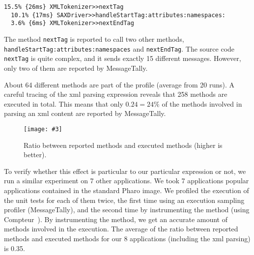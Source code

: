 \documentclass{sig-alternate}
\newcommand{\ct}{\lstinline[backgroundcolor=\color{white},basicstyle=\footnotesize\ttfamily]}
\newcommand{\fig}[4]{
	\begin{figure}[#1]
		\centering
		\texttt{[image: \#3]}
		\caption{\label{fig:#3}#4}
	\end{figure}}
\begin{document}
\begin{lstlisting}
15.5% {26ms} XMLTokenizer>>nextTag
  10.1% {17ms} SAXDriver>>handleStartTag:attributes:namespaces:
  3.6% {6ms} XMLTokenizer>>nextEndTag
\end{lstlisting}

The method \ct{nextTag} is reported to call two other methods, \ct{handleStartTag:attributes:namespaces} and \ct{nextEndTag}. The source code \ct{nextTag} is quite complex, and it sends exactly 15 different messages. However, only two of them are reported by MessageTally.

About 64 different methods are part of the profile (average from 20 runs). A careful tracing of the xml parsing expression reveals that 258 methods are executed in total. This means that only $0.24 = 24\%$ of the methods involved in parsing an xml content are reported by MessageTally. 

		

\fig{h}{0.5}{Ratio}{Ratio between reported methods and executed methods (higher is better).}

To verify whether this effect is particular to our particular expression or not, we run a similar experiment on 7 other applications.
We took 7 applications popular applications contained in the standard Pharo image. We profiled the execution of the unit tests for each of them twice, the first time using an execution sampling profiler (MessageTally), and the second time by instrumenting the method (using Compteur~\cite{Berg11d}).
By instrumenting the method, we get an accurate amount of methods involved in the execution. The average of the ratio between reported methods and executed methods for our 8 applications (including the xml parsing) is 0.35. 
\end{document}
